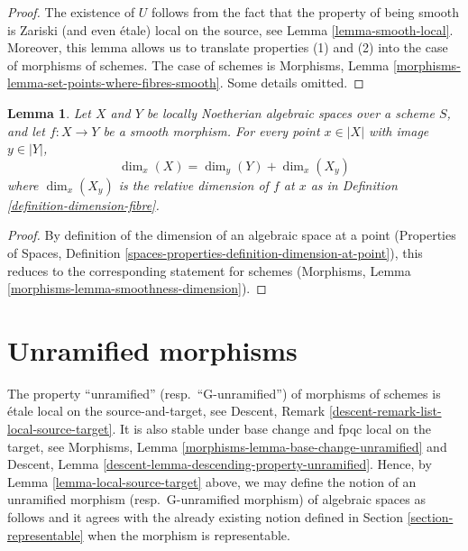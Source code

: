 \documentclass{stacks-project}
\theoremstyle{plain}
\newtheorem{lemma}[subsection]{Lemma}
\theoremstyle{definition}
\theoremstyle{remark}
\numberwithin{equation}{subsection}
\begin{document}
\begin{proof}
The existence of $U$ follows from the fact that the property
of being smooth is Zariski (and even \'etale) local on the source, see
Lemma \ref{lemma-smooth-local}. Moreover, this lemma allows
us to translate properties (1) and (2) into the case
of morphisms of schemes. The case of schemes is
Morphisms, Lemma \ref{morphisms-lemma-set-points-where-fibres-smooth}.
Some details omitted.
\end{proof}

\begin{lemma}
\label{lemma-smoothness-dimension-spaces}
Let $X$ and $Y$ be locally Noetherian algebraic spaces over a scheme
$S$, and let $f : X \to Y$ be a smooth morphism.
For every point $x \in |X|$ with image $y \in |Y|$,
$$
\dim_x(X) = \dim_y(Y) + \dim_x(X_y)
$$
where $\dim_x(X_y)$ is the relative dimension of $f$ at $x$ as
in Definition \ref{definition-dimension-fibre}.
\end{lemma}

\begin{proof}
By definition of the dimension of an algebraic space
at a point (Properties of Spaces, Definition
\ref{spaces-properties-definition-dimension-at-point}),
this reduces to the corresponding statement for schemes
(Morphisms, Lemma \ref{morphisms-lemma-smoothness-dimension}).
\end{proof}



\section{Unramified morphisms}
\label{section-unramified}

\noindent
The property ``unramified'' (resp.\ ``G-unramified'')
of morphisms of schemes is \'etale local on the source-and-target, see
Descent, Remark \ref{descent-remark-list-local-source-target}.
It is also stable under base change and fpqc local on the target, see
Morphisms, Lemma \ref{morphisms-lemma-base-change-unramified} and
Descent, Lemma \ref{descent-lemma-descending-property-unramified}.
Hence, by
Lemma \ref{lemma-local-source-target}
above, we may define the notion of an unramified morphism
(resp.\ G-unramified morphism) of algebraic spaces
as follows and it agrees with the already existing notion defined in
Section \ref{section-representable}
when the morphism is representable.
\end{document}
